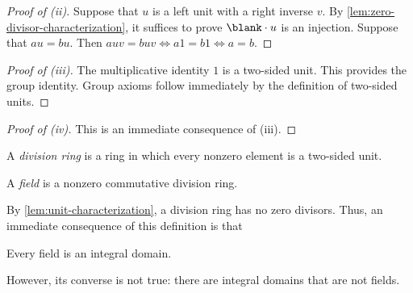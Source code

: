 \documentclass{amsart}
\begin{document}
\begin{proof}[Proof of (ii)]
  Suppose that $u$ is a left unit with a right inverse $v$.
  By \cref{lem:zero-divisor-characterization}, it suffices to prove $\blank \cdot u$ is an injection.
  Suppose that $au = bu$.
  Then $auv = buv \iff a1 = b1 \iff a = b$.
\end{proof}

\begin{proof}[Proof of (iii)]
  The multiplicative identity $1$ is a two-sided unit.
  This provides the group identity.
  Group axioms follow immediately by the definition of two-sided units.
\end{proof}

\begin{proof}[Proof of (iv)]
  This is an immediate consequence of (iii).
\end{proof}

\begin{defn}
  A \emph{division ring} is a ring in which every nonzero element is a two-sided unit.
\end{defn}

\begin{defn}
  A \emph{field} is a nonzero commutative division ring.
\end{defn}

By \cref{lem:unit-characterization}, a division ring has no zero divisors.
Thus, an immediate consequence of this definition is that

\begin{cor}
  Every field is an integral domain.
\end{cor}
However, its converse is not true: there are integral domains that are not fields.
\end{document}
